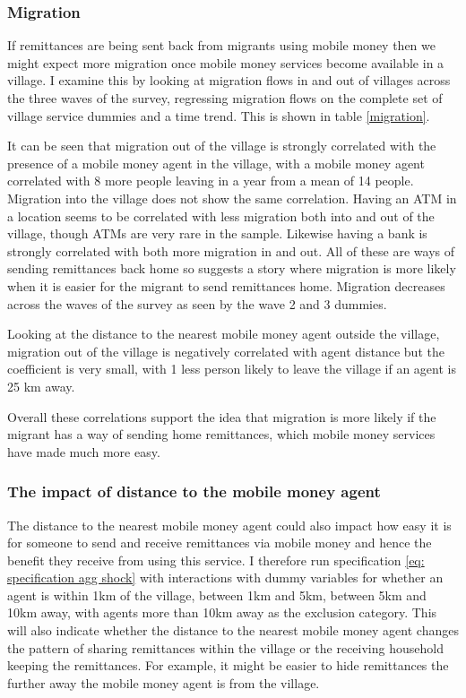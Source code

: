 \subsubsection{Migration}
If remittances are being sent back from migrants using mobile money then we might expect more migration once mobile money services become available in a village. I examine this by looking at migration flows in and out of villages across the three waves of the survey, regressing migration flows on the complete set of village service dummies and a time trend. This is shown in table \ref{migration}. 

It can be seen that migration out of the village is strongly correlated with the presence of a mobile money agent in the village, with a mobile money agent correlated with 8 more people leaving in a year from a mean of 14 people. Migration into the village does not show the same correlation. Having an ATM in a location seems to be correlated with less migration both into and out of the village, though ATMs are very rare in the sample. Likewise having a bank is strongly correlated with both more migration in and out. All of these are ways of sending remittances back home so suggests a story where migration is more likely when it is easier for the migrant to send remittances home. Migration decreases across the waves of the survey as seen by the wave 2 and 3 dummies. 

Looking at the distance to the nearest mobile money agent outside the village, migration out of the village is negatively correlated with agent distance but the coefficient is very small, with 1 less person likely to leave the village if an agent is 25 km away.

Overall these correlations support the idea that migration is more likely if the migrant has a way of sending home remittances, which mobile money services have made much more easy. 


\subsubsection{The impact of distance to the mobile money agent}
The distance to the nearest mobile money agent could also impact how easy it is for someone to send and receive remittances via mobile money and hence the benefit they receive from using this service. I therefore run specification \eqref{eq: specification agg shock} with interactions with dummy variables for whether an agent is within 1km of the village, between 1km and 5km, between 5km and 10km away, with agents more than 10km away as the exclusion category. This will also indicate whether the distance to the nearest mobile money agent changes the pattern of sharing remittances within the village or the receiving household keeping the remittances. For example, it might be easier to hide remittances the further away the mobile money agent is from the village. 

